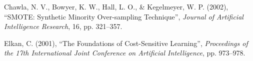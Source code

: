 \begin{enumerate}[label={[\arabic*]}, ref=\arabic*, leftmargin=*, labelsep=0.6em,
                  itemsep=5pt, start=8]
\item\label{ref:chawla2002} Chawla, N. V., Bowyer, K. W., Hall, L. O., \&
Kegelmeyer, W. P. (2002), ``SMOTE: Synthetic Minority Over-sampling Technique'',
\textit{Journal of Artificial Intelligence Research}, 16, pp. 321--357.

\item\label{ref:elkan2001} Elkan, C. (2001), ``The Foundations of Cost-Sensitive
Learning'', \textit{Proceedings of the 17th International Joint Conference on
Artificial Intelligence}, pp. 973--978.

\end{enumerate}
\endgroup
